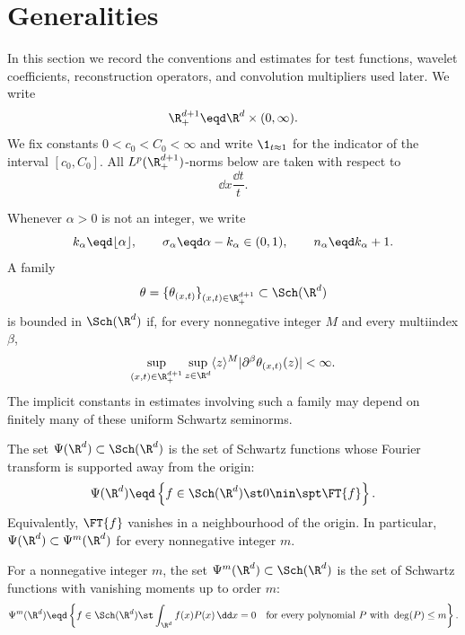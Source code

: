 \section{Generalities}\label{sec:generalities}

{} {}

In this section we record the conventions and estimates for test functions,
wavelet coefficients, reconstruction operators, and convolution multipliers
used later. We write
\[
  \R^{d + 1}_+ \eqd \R^d \times (0, \infty).
\]
We fix constants \(0 < c_0 < C_0 < \infty\) and write
\(\1_{t \approx 1}\) for the indicator of the interval \([c_0, C_0]\). All
\(L^p(\R^{d + 1}_+)\)-norms below are taken with respect to
\[
  \dd x \frac{\dd t}{t}.
\]

Whenever \(\alpha > 0\) is not an integer, we write
\[
  k_{\alpha} \eqd \lfloor \alpha \rfloor,
  \qquad
  \sigma_{\alpha} \eqd \alpha - k_{\alpha} \in (0, 1),
  \qquad
  n_{\alpha} \eqd k_{\alpha} + 1.
\]
A family
\[
  \theta = \{\theta_{(x, t)}\}_{(x, t) \in \R^{d + 1}_+}
  \subset \Sch(\R^d)
\]
is bounded in \(\Sch(\R^d)\) if, for every nonnegative integer \(M\) and every
multiindex \(\beta\),
\[
  \sup_{(x, t) \in \R^{d + 1}_+}
  \sup_{z \in \R^d}
  \langle z \rangle^M |\partial^{\beta}\theta_{(x, t)}(z)| < \infty.
\]
The implicit constants in estimates involving such a family may depend on
finitely many of these uniform Schwartz seminorms.

\begin{definition}\label{def:psi-classes}
  The set \(\Psi(\R^d) \subset \Sch(\R^d)\) is the set of Schwartz functions
  whose Fourier transform is supported away from the origin:
  \begin{equation}
    \label{eq:psi-fourier-support}
    \Psi(\R^d)
    \eqd
    \left\{
      f \in \Sch(\R^d) \st 0 \nin \spt \FT{f}
    \right\}.
  \end{equation}
  Equivalently, \(\FT{f}\) vanishes in a neighbourhood of the origin. In
  particular, \(\Psi(\R^d) \subset \Psi^m(\R^d)\) for every nonnegative
  integer \(m\).

  For a nonnegative integer \(m\), the set
  \(\Psi^m(\R^d) \subset \Sch(\R^d)\) is the set of Schwartz functions with
  vanishing moments up to order \(m\):
  \begin{equation}
    \label{eq:psi-vanishing-moments}
    \Psi^m(\R^d)
    \eqd
    \left\{
      f \in \Sch(\R^d)
      \st
      \int_{\R^d} f(x) P(x) \, \dd x = 0
      \quad
      \text{for every polynomial } P \text{ with } \deg(P) \le m
    \right\}.
  \end{equation}
\end{definition}

